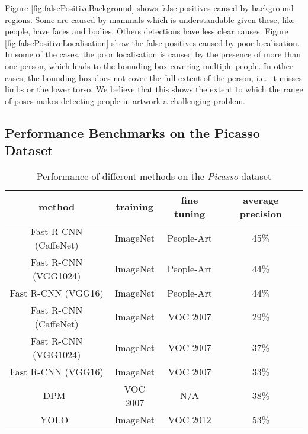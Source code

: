 \documentclass[runningheads]{llncs}
\begin{document}
Figure \ref{fig:falsePositiveBackground} shows false positives caused by background regions.
Some are caused by mammals which is understandable given these, like people, have faces and bodies.
Others detections have less clear causes.
Figure \ref{fig:falsePositiveLocalisation} show the false positives caused by poor localisation.
In some of the cases, the poor localisation is caused by the presence of more than one person, which leads to the bounding box covering multiple people.
In other cases, the bounding box does not cover the full extent of the person, i.e.\ it misses limbs or the lower torso.
We believe that this shows the extent to which the range of poses makes detecting people in \ac{artwork} a challenging problem.
 
\subsection{Performance Benchmarks on the Picasso Dataset}
\label{sec:PicassoBenchmarks}
\begin{table}
\begin{center}
\caption{Performance of different methods on the \textit{Picasso} dataset\label{tbl:PicassoPerformanceBenchmarks}}
\begin{tabular}{cccc}
    \hline
    \textbf{method} & \textbf{training}& \textbf{fine tuning} &
    \textbf{average precision} \\
    \hline
 Fast R-CNN (CaffeNet) & ImageNet & People-Art & 45\% \\ Fast R-CNN (VGG1024) & ImageNet & People-Art & 44\% \\ Fast R-CNN (VGG16) & ImageNet & People-Art & 44\% \\  \hline
 Fast R-CNN (CaffeNet) & ImageNet & VOC 2007 & 29\% \\ Fast R-CNN (VGG1024) & ImageNet & VOC 2007 & 37\% \\ Fast R-CNN (VGG16) & ImageNet & VOC 2007 & 33\% \\  \hline
 DPM~\cite{felzenszwalb2010object} & VOC 2007 & N/A & 38\% \\
 YOLO~\cite{redmon2015you} & ImageNet & VOC 2012 & 53\% \\
  \hline

  \end{tabular} \end{center}
\end{table}
\end{document}
